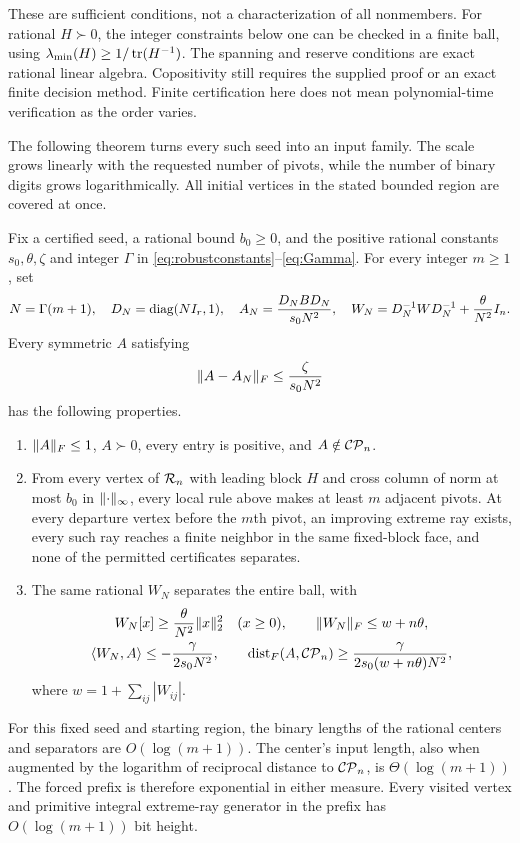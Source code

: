 These are sufficient conditions, not a characterization of all nonmembers. For rational $H\succ0$, the integer constraints below one can be checked in a finite ball, using $\lambda_{\min}(H)\ge1/\operatorname{tr}(H^{-1})$. The spanning and reserve conditions are exact rational linear algebra. Copositivity still requires the supplied proof or an exact finite decision method. Finite certification here does not mean polynomial-time verification as the order varies.

The following theorem turns every such seed into an input family. The scale grows linearly with the requested number of pivots, while the number of binary digits grows logarithmically. All initial vertices in the stated bounded region are covered at once.

\begin{theorem}\label{thm:amplification}
Fix a certified seed, a rational bound $b_0\ge0$, and the positive rational constants $s_0,\theta,\zeta$ and integer $\Gamma$ in \eqref{eq:robustconstants}--\eqref{eq:Gamma}. For every integer $m\ge1$, set
\begin{equation}\label{eq:amplified}
 N=\Gamma(m+1),\quad D_N=\operatorname{diag}(NI_r,1),\quad
 A_N=\frac{D_NBD_N}{s_0N^2},\quad
 W_N=D_N^{-1}WD_N^{-1}+\frac\theta{N^2}I_n.
\end{equation}
Every symmetric $A$ satisfying
\begin{equation}\label{eq:ball}
 \lVert A-A_N\rVert_F\le\frac\zeta{s_0N^2}
\end{equation}
has the following properties.
\begin{enumerate}[label=(\alph*),itemsep=3pt]
\item $\lVert A\rVert_F\le1$, $A\succ0$, every entry is positive, and $A\notin\mathcal{CP}_n$.
\item From every vertex of $\mathcal R_n$ with leading block $H$ and cross column of norm at most $b_0$ in $\lVert \cdot\rVert_\infty$, every local rule above makes at least $m$ adjacent pivots. At every departure vertex before the $m$th pivot, an improving extreme ray exists, every such ray reaches a finite neighbor in the same fixed-block face, and none of the permitted certificates separates.
\item The same rational $W_N$ separates the entire ball, with
\begin{gather}\label{eq:ampmargin}
 W_N[x]\ge\frac\theta{N^2}\lVert x\rVert_2^2\quad(x\ge0),\qquad
 \lVert W_N\rVert_F\le w+n\theta,\\
 \label{eq:ampdistance}
 \langle W_N,A\rangle\le-\frac\gamma{2s_0N^2},\qquad
 \operatorname{dist}_F(A,\mathcal{CP}_n)\ge\frac\gamma{2s_0(w+n\theta)N^2},
\end{gather}
where $w=1+\sum_{ij}|W_{ij}|$.
\end{enumerate}
For this fixed seed and starting region, the binary lengths of the rational centers and separators are $O(\log(m+1))$. The center's input length, also when augmented by the logarithm of reciprocal distance to $\mathcal{CP}_n$, is $\Theta(\log(m+1))$. The forced prefix is therefore exponential in either measure. Every visited vertex and primitive integral extreme-ray generator in the prefix has $O(\log(m+1))$ bit height.
\end{theorem}


